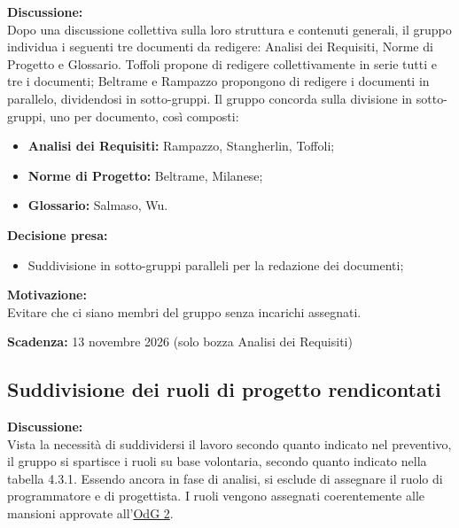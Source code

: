 \documentclass[12pt,a4paper]{article}
\newcommand{\tightlist}{\setlength{\itemsep}{1pt}\setlength{\parskip}{0pt}}
\begin{document}
\textbf{Discussione:} \\
Dopo una discussione collettiva sulla loro struttura e contenuti generali, il gruppo individua i seguenti tre documenti da redigere: Analisi dei Requisiti, Norme di Progetto e Glossario.
Toffoli propone di redigere collettivamente in serie tutti e tre i documenti;
Beltrame e Rampazzo propongono di redigere i documenti in parallelo, dividendosi in sotto-gruppi.
Il gruppo concorda sulla divisione in sotto-gruppi, uno per documento, così composti:
\begin{itemize}
\tightlist
\item \textbf{Analisi dei Requisiti:} Rampazzo, Stangherlin, Toffoli;
\item \textbf{Norme di Progetto:} Beltrame, Milanese;
\item \textbf{Glossario:} Salmaso, Wu.
\end{itemize}

\textbf{Decisione presa:}
\begin{itemize}
\tightlist
\item[$\checkmark$] Suddivisione in sotto-gruppi paralleli per la redazione dei documenti;
\end{itemize}

\textbf{Motivazione:} \\
Evitare che ci siano membri del gruppo senza incarichi assegnati.

\textbf{Scadenza:} 13 novembre 2026 (solo bozza Analisi dei Requisiti)

\hypertarget{odg-3}{%
\subsection{Suddivisione dei ruoli di progetto rendicontati}}

\textbf{Discussione:} \\
Vista la necessità di suddividersi il lavoro secondo quanto indicato nel preventivo, il gruppo si spartisce i ruoli su base volontaria, secondo quanto indicato nella tabella 4.3.1.
Essendo ancora in fase di analisi, si esclude di assegnare il ruolo di programmatore e di progettista.
I ruoli vengono assegnati coerentemente alle mansioni approvate all'\hyperlink{odg-2}{OdG 2}.
\end{document}
